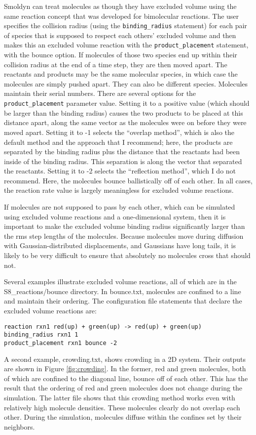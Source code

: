 \documentclass {scrbook}
\newcommand {\ttt} {\texttt}
\begin{document}
Smoldyn can treat molecules as though they have excluded volume using the same reaction concept that was developed for bimolecular reactions. The user specifies the collision radius (using the \ttt{binding\_radius} statement) for each pair of species that is supposed to respect each others' excluded volume and then makes this an excluded volume reaction with the \ttt{product\_placement} statement, with the bounce option. If molecules of those two species end up within their collision radius at the end of a time step, they are then moved apart. The reactants and products may be the same molecular species, in which case the molecules are simply pushed apart. They can also be different species. Molecules maintain their serial numbers. There are several options for the \ttt{product\_placement} parameter value. Setting it to a positive value (which should be larger than the binding radius) causes the two products to be placed at this distance apart, along the same vector as the molecules were on before they were moved apart. Setting it to -1 selects the ``overlap method'', which is also the default method and the approach that I recommend; here, the products are separated by the binding radius plus the distance that the reactants had been inside of the binding radius. This separation is along the vector that separated the reactants. Setting it to -2 selects the ``reflection method'', which I do not recommend. Here, the molecules bounce ballistically off of each other. In all cases, the reaction rate value is largely meaningless for excluded volume reactions.

If molecules are not supposed to pass by each other, which can be simulated using excluded volume reactions and a one-dimensional system, then it is important to make the excluded volume binding radius significantly larger than the rms step lengths of the molecules. Because molecules move during diffusion with Gaussian-distributed displacements, and Gaussians have long tails, it is likely to be very difficult to ensure that absolutely no molecules cross that should not.

Several examples illustrate excluded volume reactions, all of which are in the S8\_reactions/bounce directory. In bounce.txt, molecules are confined to a line and maintain their ordering. The configuration file statements that declare the excluded volume reactions are:
\begin{lstlisting}[style=SSAC]
reaction rxn1 red(up) + green(up) -> red(up) + green(up)
binding_radius rxn1 1
product_placement rxn1 bounce -2
\end{lstlisting}
A second example, crowding.txt, shows crowding in a 2D system. Their outputs are shown in Figure \ref{fig:crowding}. In the former, red and green molecules, both of which are confined to the diagonal line, bounce off of each other. This has the result that the ordering of red and green molecules does not change during the simulation. The latter file shows that this crowding method works even with relatively high molecule densities. These molecules clearly do not overlap each other. During the simulation, molecules diffuse within the confines set by their neighbors.
\end{document}
